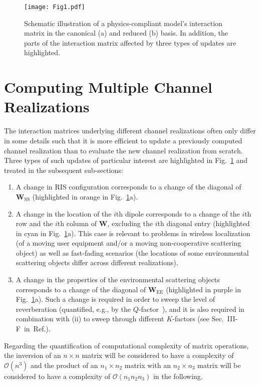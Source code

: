\documentclass[journal,12pt,onecolumn,draftclsnofoot]{IEEEtran}
\begin{document}
\begin{figure}[h]
\centering
\texttt{[image: Fig1.pdf]}
\caption{Schematic illustration of  a physics-compliant model's interaction matrix in the canonical (a) and reduced (b) basis. In addition, the parts of the interaction matrix affected by three types of updates are highlighted. }
\label{fig1}
\end{figure}

\section{Computing Multiple Channel Realizations}\label{sec_opportunities}

The interaction matrices underlying different channel realizations often only differ in some details such that it is more efficient to update a previously computed channel realization than to evaluate the new channel realization from scratch.
Three types of such updates of particular interest are highlighted in Fig.~\ref{fig1} and treated in the subsequent sub-sections:

\begin{enumerate}[label=(\roman*)]
    \item A change in RIS configuration corresponds to a change of the diagonal of $\mathbf{W}_{\mathrm{SS}}$ (highlighted in orange in Fig.~\ref{fig1}a).
    \item A change in the location of the $i$th dipole corresponds to a change of the $i$th row and the $i$th column of $\mathbf{W}$, excluding the $i$th diagonal entry (highlighted in cyan in Fig.~\ref{fig1}a). This case is relevant to problems in wireless localization (of a moving user equipment and/or a moving non-cooperative scattering object) as well as fast-fading scenarios (the locations of some environmental scattering objects differ across different realizations).
    \item A change in the properties of the environmental scattering objects corresponds to a change of the diagonal of $\mathbf{W}_{\mathrm{EE}}$ (highlighted in purple in Fig.~\ref{fig1}a). Such a change is required in order to sweep the level of reverberation (quantified, e.g., by the $Q$-factor~\cite{west2017best}), and it is also required in combination with (ii) to sweep through different $K$-factors (see Sec.~III-F~in~Ref.\cite{PhysFad}).

\end{enumerate}


Regarding the quantification of computational complexity of matrix operations, the inversion of an $n \times n$ matrix will be considered to have a complexity of $\mathcal{O}\left(n^3\right)$ and the product of an $n_1 \times n_2$ matrix with an $n_2 \times n_3$ matrix will be considered to have a complexity of $\mathcal{O}\left(n_1 n_2 n_3\right)$ in the following.
\end{document}
